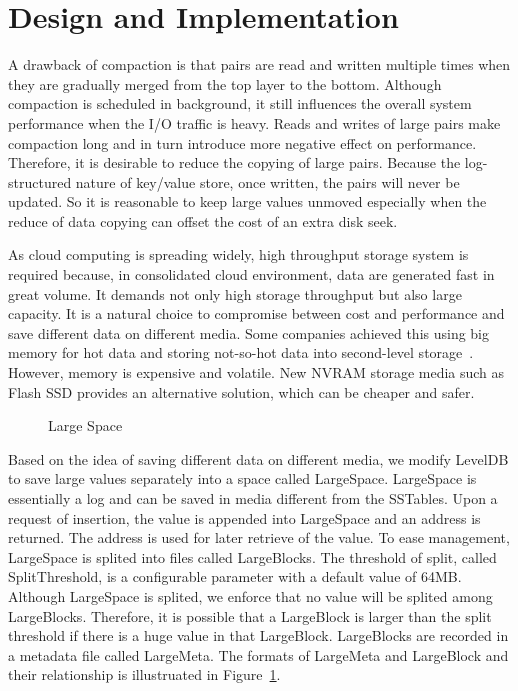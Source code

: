 \section{Design and Implementation}
\label{sec:implementation}


A drawback of compaction is that pairs are read and written multiple
times when they are gradually merged from the top layer to the bottom.
Although compaction is scheduled in background, it still influences
the overall system performance when the I/O traffic is heavy. Reads
and writes of large pairs make compaction long and in turn introduce
more negative effect on performance. Therefore, it is desirable to
reduce the copying of large pairs. Because the log-structured nature
of key/value store, once written, the pairs will never be updated. So
it is reasonable to keep large values unmoved especially when the
reduce of data copying can offset the cost of an extra disk seek.

As cloud computing is spreading widely, high throughput storage system
is required because, in consolidated cloud environment, data are
generated fast in great volume. It demands not only high storage
throughput but also large capacity. It is a natural choice to
compromise between cost and performance and save different data on
different media. Some companies achieved this using big memory for hot
data and storing not-so-hot data into second-level
storage~\cite{level_lifetime}.  However, memory is expensive and
volatile. New NVRAM storage media such as Flash SSD provides an
alternative solution, which can be cheaper and safer.

\begin{figure}[t]
\begin{centering}
\caption{Large Space}
\label{fig:space}
\end{centering}
\end{figure}

Based on the idea of saving different data on different media, we
modify LevelDB to save large values separately into a space called
LargeSpace. LargeSpace is essentially a log and can be saved in media
different from the SSTables. Upon a request of insertion, the value is
appended into LargeSpace and an address is returned. The address is
used for later retrieve of the value. To ease management, LargeSpace
is splited into files called LargeBlocks. The threshold of split,
called SplitThreshold, is a configurable parameter with a default
value of 64MB. Although LargeSpace is splited, we enforce that no
value will be splited among LargeBlocks. Therefore, it is possible
that a LargeBlock is larger than the split threshold if there is a
huge value in that LargeBlock.  LargeBlocks are recorded in a metadata
file called LargeMeta. The formats of LargeMeta and LargeBlock and
their relationship is illustruated in Figure~\ref{fig:space}.

